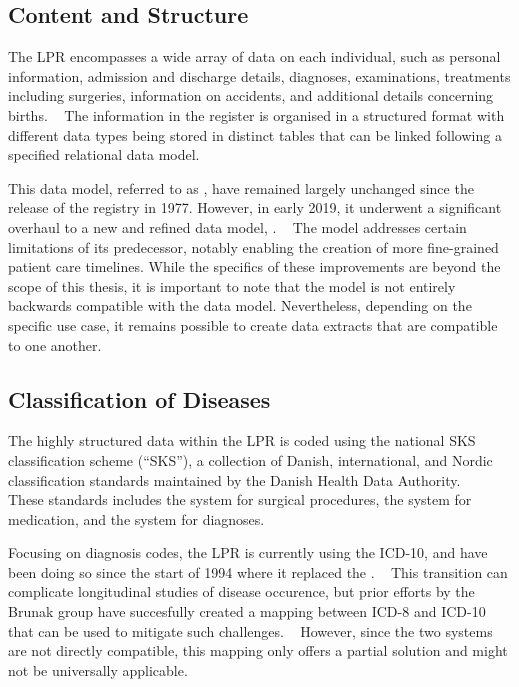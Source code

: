 \subsection{Content and Structure}

The \ac{LPR} encompasses a wide array of data on each individual, 
such as personal information, admission and discharge details, diagnoses, 
examinations, treatments including surgeries, information on accidents, 
and additional details concerning births. 
~\autocite{schmidtDanish2015}
The information in the register is organised in a
structured format with different data types being stored 
in distinct tables that can be linked following a 
specified relational data model.
~\autocite{lpr2dok}

This data model, referred to as ,  
have remained largely unchanged since the release of the registry in 1977.
However, in early 2019, it underwent a significant overhaul to a 
new and refined data model, .
~\autocite{nielsenLPR32018}
The  model addresses certain limitations of its predecessor, 
notably enabling the creation of more fine-grained patient care timelines. 
While the specifics of these improvements are beyond the scope of this thesis, 
it is important to note that the  model is not entirely 
backwards compatible with the  data model. 
Nevertheless, depending on the specific use case, 
it remains possible to create data extracts that are compatible
to one another.

\subsection{Classification of Diseases}

The highly structured data within the \ac{LPR} 
is coded using the national \acs{SKS} classification scheme (\enquote{\acl{SKS}}), 
a collection of Danish, international, and Nordic classification standards
maintained by the Danish Health Data Authority.
~\autocite{schmidtDanish2015}
These standards includes
the  system for surgical procedures,
the  system for medication,
and the  system for diagnoses. 
~\autocite{schmidtDanish2015}

Focusing on diagnosis codes, 
the \ac{LPR} is currently using the \ac{ICD-10},
and have been doing so since the start of 1994
where it replaced the .
~\autocite{schmidtDanish2015}
This transition can complicate longitudinal studies of disease occurence, 
but prior efforts by the Brunak group have succesfully
created a mapping between \ac{ICD-8} and \ac{ICD-10}
that can be used to mitigate such challenges.
~\autocite{pedersenUnidirectional2023}
However, since the two systems are not directly compatible, 
this mapping only offers a partial solution 
and might not be universally applicable.

